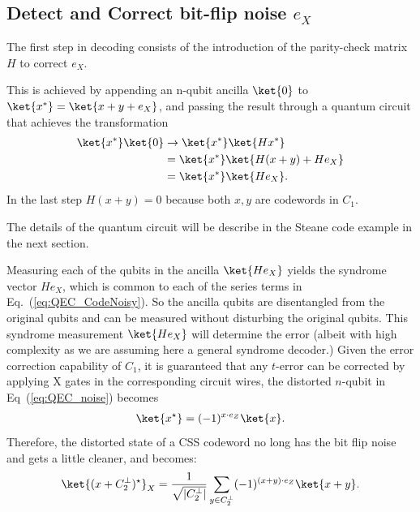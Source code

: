 \subsection{Detect and Correct bit-flip noise \(e_X\)}
The first step in decoding consists of the introduction of the parity-check matrix \(H\) to correct \(e_X\). 

This is achieved by appending an n-qubit ancilla \(\ket{0}\) to \(\ket{x^{*}} = \ket{x + y + e_X}\), and passing the result through a quantum circuit that achieves the transformation \
\begin{align}
    \ket{x^{*}}\ket{0} &\rightarrow \ket{x^{*}}\ket{H x^{*}}  \label{eq:QEC_BEC} \\ 
    &= \ket{x^{*}}\ket{H(x+y) + H e_X}\nonumber\\
    &= \ket{x^{*}}\ket{H e_X}.  \nonumber 
\end{align} 
In the last step \(H(x+y)=0\) because both \(x, y\) are codewords in \(C_1\).  

The details of the quantum circuit will be describe in the Steane code example in the next section. 

Measuring each of the qubits in the ancilla \(\ket{H e_X}\) yields the syndrome vector \(H e_X\), which is common to each of the series terms in Eq.~(\ref{eq:QEC_CodeNoisy}). So the ancilla qubits are disentangled from the original qubits and can be measured without disturbing the original qubits. This syndrome measurement \(\ket{H e_X}\) will determine the error (albeit with high complexity as we are assuming here a general syndrome decoder.)
Given the error correction capability of \(C_1\), it is guaranteed that any \(t\)-error can be corrected by applying X gates in the corresponding circuit wires, the distorted \(n\)-qubit in Eq~(\ref{eq:QEC_noise}) becomes
\begin{align*}
       \ket{x^{\star}} = (-1)^{x\cdot e_Z} \ket{x}. 
\end{align*}
Therefore, the distorted state of a CSS codeword no long has the bit flip noise and gets a little cleaner, and becomes:  
\begin{align}
\ket{(x + C_2^{\perp})^{\star}}_{X} = \frac{1}{\sqrt{|C_2^{\perp}|}}\sum_{y \in C_2^{\perp}} (-1)^{(x+y)\cdot e_Z} \ket{x+y}.
\label{eq:QEC_CSSII}
\end{align}


